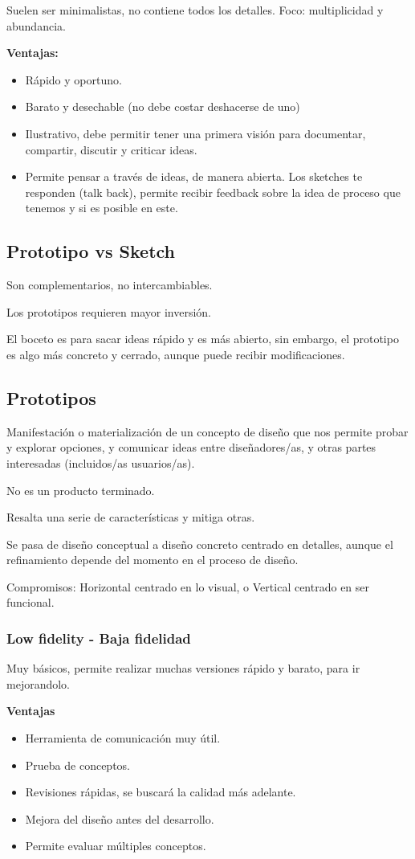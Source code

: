 \documentclass[12pt]{report} %
\begin{document}
Suelen ser minimalistas, no contiene todos los detalles. Foco: multiplicidad y abundancia.

\textbf{Ventajas:}
\begin{itemize}
  \item Rápido y oportuno.
  \item Barato y desechable (no debe costar deshacerse de uno)
  \item Ilustrativo, debe permitir tener una primera visión para documentar, compartir, discutir y criticar ideas.
  \item Permite pensar a través de ideas, de manera abierta. Los sketches te responden (talk back), permite recibir feedback sobre la idea de proceso que tenemos y si es posible en este.
\end{itemize}

\subsection{Prototipo vs Sketch}
Son complementarios, no intercambiables.

Los prototipos requieren mayor inversión.

El boceto es para sacar ideas rápido y es más abierto, sin embargo, el prototipo es algo más concreto y cerrado, aunque puede recibir modificaciones.

\subsection{Prototipos}
Manifestación o materialización de un concepto de diseño que nos permite probar y explorar opciones, y comunicar ideas entre diseñadores/as, y otras partes interesadas (incluidos/as usuarios/as).

No es un producto terminado.

Resalta una serie de características y mitiga otras.

Se pasa de diseño conceptual a diseño concreto centrado en detalles, aunque el refinamiento depende del momento en el proceso de diseño.

Compromisos: Horizontal centrado en lo visual, o Vertical centrado en ser funcional.
\subsubsection{Low fidelity - Baja fidelidad}
Muy básicos, permite realizar muchas versiones rápido y barato, para ir mejorandolo.
  
\textbf{Ventajas}
  \begin{itemize}
    \item Herramienta de comunicación muy útil.
    \item Prueba de conceptos.
    \item Revisiones rápidas, se buscará la calidad más adelante.
    \item Mejora del diseño antes del desarrollo.
    \item Permite evaluar múltiples conceptos.
  \end{itemize}
\end{document}
